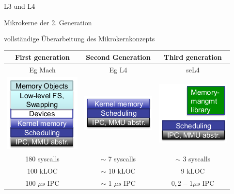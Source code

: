 \documentclass[a4paper]{article}
\begin{document}
\begin{multicols}{3}
    L3 und L4
    \begin{itemize*}
        \item Mikrokerne der 2. Generation
        \item vollständige Überarbeitung des Mikrokernkonzepts
    \end{itemize*}
    \begin{tabular}{c|c|c}
        First generation                                                                      & Second Generation    & Third generation  \\\hline
        Eg Mach                                                                               & Eg L4                & seL4              \\
        \includegraphics[width=.2\linewidth]{Assets/AdvancedOperatingSystems-l4-first-g.png}  &
        \includegraphics[width=.2\linewidth]{Assets/AdvancedOperatingSystems-L4-second-g.png} &
        \includegraphics[width=.2\linewidth]{Assets/AdvancedOperatingSystems-l4-third-g.png}                                             \\
        180 syscalls                                                                          & $\sim$ 7 syscalls    & $\sim$ 3 syscalls \\
        100 kLOC                                                                              & $\sim$ 10 kLOC       & 9 kLOC            \\
        100 $\mu s$ IPC                                                                       & $\sim$ 1 $\mu s$ IPC & $0,2-1 \mu s$ IPC
    \end{tabular}


\end{multicols}
\end{document}
